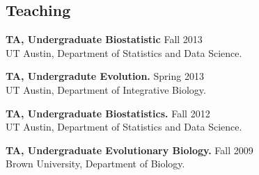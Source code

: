 \documentclass[line, margin]{res}
\begin{document}
\begin{resume}
\vspace{0.75cm}


\section{Teaching} 

\textbf{TA, Undergraduate Biostatistic} \hfill Fall 2013 \\ UT Austin, Department of Statistics and Data Science.

\textbf{TA, Undergradute Evolution.} \hfill Spring 2013 \\ UT Austin, Department of Integrative Biology.

\textbf{TA, Undergraduate Biostatistics.} \hfill Fall 2012 \\ UT Austin, Department of 
Statistics and Data Science. 

\textbf{TA, Undergraduate Evolutionary Biology.} \hfill Fall 2009 \\ Brown University, Department of Biology. 



\end{resume}
\end{document}
